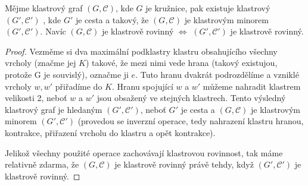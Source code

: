 \begin{theorem}
Mějme klastrový graf $(G, \mathcal C)$, kde $G$ je kružnice, pak existuje klastrový $(G', \mathcal C')$ , kde $G'$ je cesta a takový, že $(G, \mathcal C)$ je klastrovým minorem $(G', \mathcal C')$. Navíc $(G, \mathcal C)$ je klastrově rovinný $\iff$ $(G', \mathcal C')$ je klastrově rovinný.
\end{theorem}
\begin{proof}
Vezměme si dva maximální podklastry klastru obsahujícího všechny vrcholy (značme jej $K$) takové, že mezi nimi vede hrana (takový existujou, protože G je souvislý), označme ji $e$. Tuto hranu dvakrát podrozdělíme a vzniklé vrcholy $w, w'$ přiřadíme do $K$. Hranu spojující $w$ a $w'$ můžeme nahradit klastrem velikosti 2, neboť $w$ a $w'$ jsou obsažený ve stejných klastrech. Tento výsledný klastrový graf je hledaným $(G', \mathcal C')$, neboť $G'$ je cesta a $(G, \mathcal C)$ je klastrovým minorem $(G', \mathcal C')$ (provedou se inverzní operace, tedy nahrazení klastru hranou, kontrakce, přiřazení vrcholu do klastru a opět kontrakce).

Jelikož všechny použité operace zachovávají klastrovou rovinnost, tak máme relativně zdarma, že $(G, \mathcal C)$ je klastrově rovinný právě tehdy, když $(G', \mathcal C')$ je klastrově rovinný.
\end{proof}